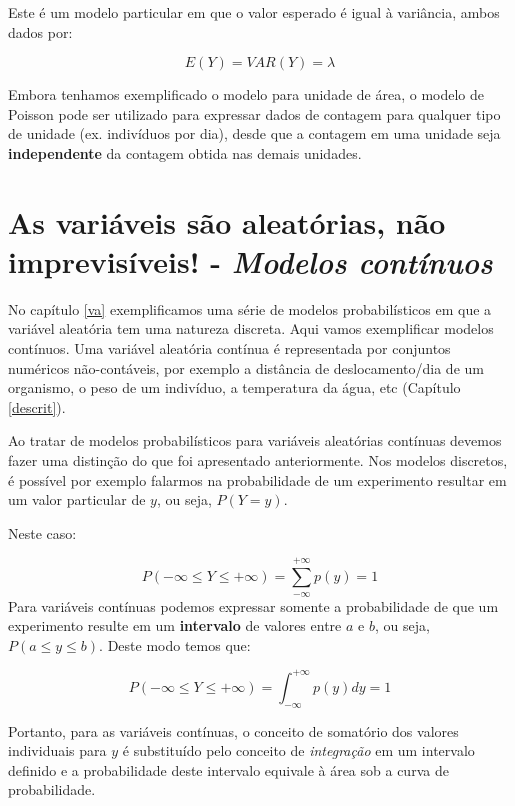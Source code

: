 \documentclass[
]{book}
\begin{document}
Este é um modelo particular em que o valor esperado é igual à variância, ambos dados por:

\[E(Y) = VAR(Y) = \lambda\]

Embora tenhamos exemplificado o modelo para unidade de área, o modelo de Poisson pode ser utilizado para expressar dados de contagem para qualquer tipo de unidade (ex. indivíduos por dia), desde que a contagem em uma unidade seja \textbf{independente} da contagem obtida nas demais unidades.

\hypertarget{vacont}{%
\chapter{\texorpdfstring{As variáveis são aleatórias, não imprevisíveis! - \emph{Modelos contínuos}}{As variáveis são aleatórias, não imprevisíveis! - Modelos contínuos}}\label{vacont}}

No capítulo \ref{va} exemplificamos uma série de modelos probabilísticos em que a variável aleatória tem uma natureza discreta. Aqui vamos exemplificar modelos contínuos. Uma variável aleatória contínua é representada por conjuntos numéricos não-contáveis, por exemplo a distância de deslocamento/dia de um organismo, o peso de um indivíduo, a temperatura da água, etc (Capítulo \ref{descrit}).

Ao tratar de modelos probabilísticos para variáveis aleatórias contínuas devemos fazer uma distinção do que foi apresentado anteriormente. Nos modelos discretos, é possível por exemplo falarmos na probabilidade de um experimento resultar em um valor particular de \(y\), ou seja, \(P(Y = y)\).

Neste caso:

\[P(-\infty \le Y \le +\infty) = \sum_{-\infty}^{+\infty} p(y) = 1\]
Para variáveis contínuas podemos expressar somente a probabilidade de que um experimento resulte em um \textbf{intervalo} de valores entre \(a\) e \(b\), ou seja, \(P(a \le y \le b)\). Deste modo temos que:

\[P(-\infty \le Y \le +\infty) = \int_{-\infty}^{+\infty}p(y) dy = 1\]

Portanto, para as variáveis contínuas, o conceito de somatório dos valores individuais para \(y\) é substituído pelo conceito de \emph{integração} em um intervalo definido e a probabilidade deste intervalo equivale à área sob a curva de probabilidade.
\end{document}
